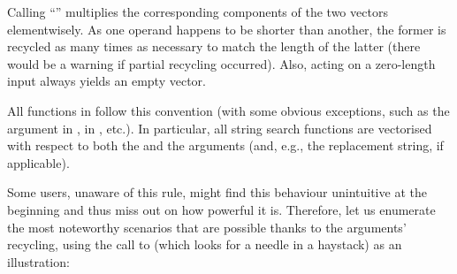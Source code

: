 \documentclass[nojss]{jss}\usepackage[]{graphicx}\usepackage[]{xcolor}
\begin{document}
\noindent
Calling ``'' multiplies the corresponding components
of the two vectors elementwisely. As one operand happens to be shorter
than another, the former is recycled as many times as necessary
to match the length of the latter (there would be a warning if partial
recycling occurred). Also, acting on a zero-length
input always yields an empty vector.


All functions in  follow this convention
(with some obvious exceptions, such as the 
argument in ,  in , etc.).
In particular, all string search functions are vectorised
with respect to both the   and the  arguments
(and, e.g., the replacement string, if applicable).

Some users, unaware of this rule, might find this behaviour
unintuitive at the beginning and thus miss out on how powerful it is. Therefore, let us enumerate
the most noteworthy scenarios that are possible thanks to the arguments' recycling,
using the call to 
(which looks for a needle in a haystack)
as an illustration:
\end{document}
